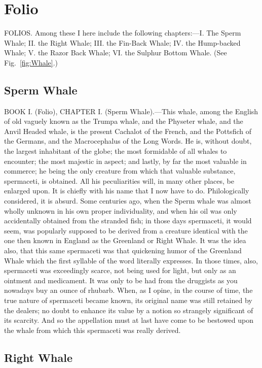 \section{Folio}

FOLIOS. Among these I here include the following chapters:—I. The Sperm Whale; II. the Right Whale; III. the Fin-Back Whale; IV. the Hump-backed Whale; V. the Razor Back Whale; VI. the Sulphur Bottom Whale.
(See Fig.~\ref{fig:Whale}.)

\subsection{Sperm Whale}

BOOK I. (Folio), CHAPTER I. (Sperm Whale).—This whale, among the English of old vaguely known as the Trumpa whale, and the Physeter whale, and the Anvil Headed whale, is the present Cachalot of the French, and the Pottsfich of the Germans, and the Macrocephalus of the Long Words. He is, without doubt, the largest inhabitant of the globe; the most formidable of all whales to encounter; the most majestic in aspect; and lastly, by far the most valuable in commerce; he being the only creature from which that valuable substance, spermaceti, is obtained. All his peculiarities will, in many other places, be enlarged upon. It is chiefly with his name that I now have to do. Philologically considered, it is absurd. Some centuries ago, when the Sperm whale was almost wholly unknown in his own proper individuality, and when his oil was only accidentally obtained from the stranded fish; in those days spermaceti, it would seem, was popularly supposed to be derived from a creature identical with the one then known in England as the Greenland or Right Whale. It was the idea also, that this same spermaceti was that quickening humor of the Greenland Whale which the first syllable of the word literally expresses. In those times, also, spermaceti was exceedingly scarce, not being used for light, but only as an ointment and medicament. It was only to be had from the druggists as you nowadays buy an ounce of rhubarb. When, as I opine, in the course of time, the true nature of spermaceti became known, its original name was still retained by the dealers; no doubt to enhance its value by a notion so strangely significant of its scarcity. And so the appellation must at last have come to be bestowed upon the whale from which this spermaceti was really derived.

\subsection{Right Whale}

